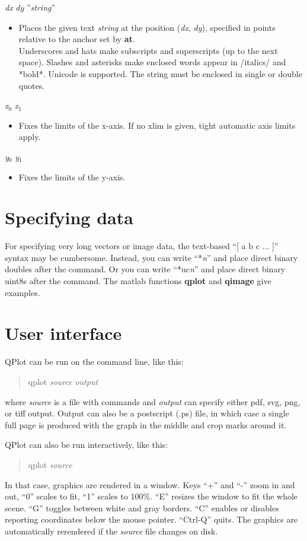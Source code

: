 \documentclass[11pt]{article}
\def\cmd#1#2{\noindent {\bf #1} #2\par}
\def\expl#1{\kern-8pt\begin{itemize}\item[]#1\end{itemize}}
\def\cref#1{{\bf #1}}
\begin{document}
\cmd{text}{\emph{dx} \emph{dy} ''\emph{string}''}
\expl{Places the given text \emph{string} at the position (\emph{dx},
  \emph{dy}), specified in points relative to the anchor set by
  \cref{at}.\\
  Underscores and hats  make
  subscripts and superscripts (up to the next space). Slashes and
  asterisks make enclosed words appear in /italics/
  and *bold*. Unicode is supported. The string must be enclosed in single or double quotes.}

\cmd{xlim}{\emph{x$_0$} \emph{x$_1$}}
\expl{Fixes the limits of the x-axis. If no xlim is given, tight
  automatic axis limits apply.}

\cmd{ylim}{\emph{y$_0$} \emph{y$_1$}}
\expl{Fixes the limits of the y-axis.}

\section{Specifying data}

For specifying very long vectors or image data, the text-based ``[ a b c ... ]''
syntax may be cumbersome. Instead, you can write ``*\emph{n}'' and
place direct binary doubles after the command. Or you can write
``*uc\emph{n}'' and place direct binary uint8s after the command. The
matlab functions \cref{qplot} and \cref{qimage} give examples.

\section{User interface}

QPlot can be run on the command line, like this:
\begin{quotation}
qplot \emph{source} \emph{output}
\end{quotation}
 where \emph{source} is a file with commands and
\emph{output} can specify either pdf, svg, png, or tiff output. Output
can also be a postscript (.ps) file, in which case a single full page
is produced with the graph in the middle and crop marks around it.

QPlot can also be run interactively, like this:
\begin{quotation}
qplot \emph{source}
\end{quotation}
 In that case, graphics are rendered in a window. Keys ``+''
and ``-'' zoom in and out, ``0'' scales to fit, ``1'' scales to
100\%. ``E'' resizes the window to fit the whole scene. ``G'' toggles
between white and gray borders. ``C'' enables or disables reporting
coordinates below the mouse pointer. ``Ctrl-Q'' quits. The graphics are
automatically rerendered if the \emph{source}
file changes on disk.
\end{document}
